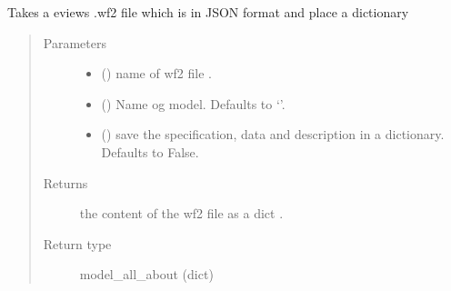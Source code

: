 \documentclass[letterpaper,10pt,english]{sphinxmanual}
\begin{document}
\begin{fulllineitems}
\label{\detokenize{index:modelgrabwf2.wf2_to_clean}}
\pysigstartsignatures
{}
\pysigstopsignatures
\sphinxAtStartPar
Takes a eviews .wf2 file \sphinxhyphen{} which is in JSON format \sphinxhyphen{} and place a
dictionary
\begin{quote}\begin{description}
\item[{Parameters}] \leavevmode\begin{itemize}
\item {} 
\sphinxAtStartPar
{} () \textendash{} name of wf2 file .

\item {} 
\sphinxAtStartPar
{} (\sphinxstyleliteralemphasis{\sphinxupquote{, }}) \textendash{} Name og model. Defaults to ‘’.

\item {} 
\sphinxAtStartPar
{} (\sphinxstyleliteralemphasis{\sphinxupquote{, }}) \textendash{} save the specification, data and description in a dictionary. Defaults to False.

\end{itemize}

\item[{Returns}] \leavevmode
\sphinxAtStartPar
the content of the wf2 file as a dict .

\item[{Return type}] \leavevmode
\sphinxAtStartPar
model\_all\_about (dict)

\end{description}\end{quote}

\end{fulllineitems}

\end{document}
